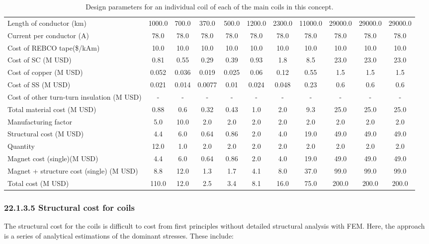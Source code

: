 \begin{table}[h]
{\begin{tabular}{lcccccccccc}
Length of conductor (km) & 1000.0 & 700.0 & 370.0 & 500.0 & 1200.0 & 2300.0 & 11000.0 & 29000.0 & 29000.0 & 29000.0 \\
Current per conductor (A) & 78.0 & 78.0 & 78.0 & 78.0 & 78.0 & 78.0 & 78.0 & 78.0 & 78.0 & 78.0 \\
\hline
Cost of REBCO tape(\$/kAm) & 10.0 & 10.0 & 10.0 & 10.0 & 10.0 & 10.0 & 10.0 & 10.0 & 10.0 & 10.0 \\
Cost of SC (M USD) & 0.81 & 0.55 & 0.29 & 0.39 & 0.93 & 1.8 & 8.5 & 23.0 & 23.0 & 23.0 \\
Cost of copper (M USD) & 0.052 & 0.036 & 0.019 & 0.025 & 0.06 & 0.12 & 0.55 & 1.5 & 1.5 & 1.5 \\
Cost of SS (M USD) & 0.021 & 0.014 & 0.0077 & 0.01 & 0.024 & 0.048 & 0.23 & 0.6 & 0.6 & 0.6 \\
Cost of other turn-turn insulation (M USD) & - & - & - & - & - & - & - & - & - & - \\
Total material cost (M USD) & 0.88 & 0.6 & 0.32 & 0.43 & 1.0 & 2.0 & 9.3 & 25.0 & 25.0 & 25.0 \\
Manufacturing factor & 5.0 & 10.0 & 2.0 & 2.0 & 2.0 & 2.0 & 2.0 & 2.0 & 2.0 & 2.0 \\
Structural cost (M USD) & 4.4 & 6.0 & 0.64 & 0.86 & 2.0 & 4.0 & 19.0 & 49.0 & 49.0 & 49.0 \\
Quantity & 12.0 & 1.0 & 2.0 & 2.0 & 2.0 & 2.0 & 2.0 & 2.0 & 2.0 & 2.0 \\
Magnet cost (single)(M USD) & 4.4 & 6.0 & 0.64 & 0.86 & 2.0 & 4.0 & 19.0 & 49.0 & 49.0 & 49.0 \\
Magnet + structure cost (single) (M USD) & 8.8 & 12.0 & 1.3 & 1.7 & 4.1 & 8.0 & 37.0 & 99.0 & 99.0 & 99.0 \\
\hline
Total cost (M USD) & 110.0 & 12.0 & 2.5 & 3.4 & 8.1 & 16.0 & 75.0 & 200.0 & 200.0 & 200.0 \\
\hline
\end{tabular}}
\caption{Design parameters for an individual coil of each of the main coils in this concept.}
\label{your-table-label}
\end{table}


\subsubsection*{22.1.3.5 Structural cost for coils}

The structural cost for the coils is difficult to cost from first principles without detailed structural analysis with FEM. Here, the approach is a series of analytical estimations of the dominant stresses. These include:

